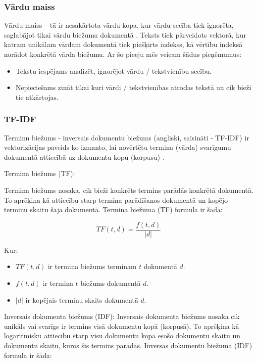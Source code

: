 \subsubsection{Vārdu maiss}
Vārdu maiss – tā ir nesakārtota vārdu kopa, kur vārdu secība tiek ignorēta, saglabājot tikai vārdu biežumu dokumentā \cite{speechandlanguageproc}. Teksts tiek pārveidots vektorā, kur katram unikālam vārdam dokumentā tiek piešķirts indekss, kā vērtību indeksā norādot konkrētā vārda biežumu. Ar šo pieeju mēs veicam šādus pieņēmumus:
\begin{itemize}
\item Tekstu iespējams analizēt, ignorējot vārdu / tekstvienību secību.
\item Nepieciešams zināt tikai kuri vārdi / tekstvienības atrodas tekstā un cik bieži tie atkārtojas.
\end{itemize}

\subsubsection{TF-IDF}
Terminu biežums - inversais dokumentu biežums (angliski, saīsināti - TF-IDF) ir vektorizācijas paveids ko izmanto, lai novērtētu termina (vārda) svarīgumu dokumentā attiecībā uz dokumentu kopu (korpusu) \cite{manning_raghavan_schutze_2008}. 

Termina biežums (TF):

Termina biežums nosaka, cik bieži konkrēts termins parādās konkrētā dokumentā. To aprēķina kā attiecību starp termina parādīšanos dokumentā un kopējo terminu skaitu šajā dokumentā. Termina biežuma (TF) formula ir šāda:

\begin{equation}
TF(t, d) = \frac{f(t, d)}{|d|}
\end{equation}

\noindent Kur:
\begin{itemize}
\item \(TF(t, d)\) ir termina biežums terminam \(t\) dokumentā \(d\).
\item \(f(t, d)\) ir termina \(t\) biežums dokumentā \(d\).
\item \(|d|\) ir kopējais terminu skaits dokumentā \(d\).
\end{itemize}

Inversais dokumenta biežums (IDF):
Inversais dokumenta biežums nosaka cik unikāls vai svarīgs ir termins visā dokumentu kopā (korpusā). To aprēķina kā logaritmisku attiecību starp visu dokumentu kopā esošo dokumentu skaitu un dokumentu skaitu, kuros šis termins parādās. Inversās dokumentu biežuma (IDF) formula ir šāda:

